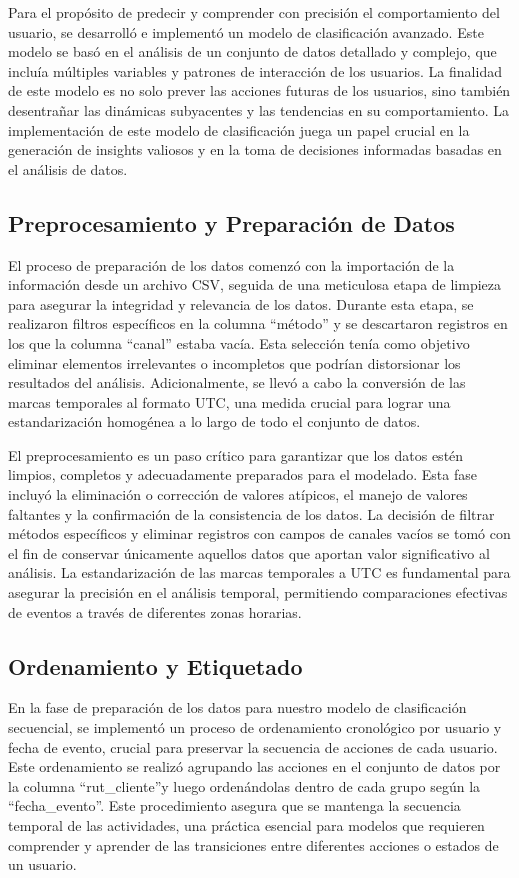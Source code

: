Para el propósito de predecir y comprender con precisión el comportamiento del usuario, se desarrolló e implementó un modelo de clasificación avanzado. Este modelo se basó en el análisis de un conjunto de datos detallado y complejo, que incluía múltiples variables y patrones de interacción de los usuarios. La finalidad de este modelo es no solo prever las acciones futuras de los usuarios, sino también desentrañar las dinámicas subyacentes y las tendencias en su comportamiento. La implementación de este modelo de clasificación juega un papel crucial en la generación de insights valiosos y en la toma de decisiones informadas basadas en el análisis de datos.

\subsection{Preprocesamiento y Preparación de Datos}

El proceso de preparación de los datos comenzó con la importación de la información desde un archivo CSV, seguida de una meticulosa etapa de limpieza para asegurar la integridad y relevancia de los datos. Durante esta etapa, se realizaron filtros específicos en la columna “método” y se descartaron registros en los que la columna “canal” estaba vacía. Esta selección tenía como objetivo eliminar elementos irrelevantes o incompletos que podrían distorsionar los resultados del análisis. Adicionalmente, se llevó a cabo la conversión de las marcas temporales al formato UTC, una medida crucial para lograr una estandarización homogénea a lo largo de todo el conjunto de datos.

El preprocesamiento es un paso crítico para garantizar que los datos estén limpios, completos y adecuadamente preparados para el modelado. Esta fase incluyó la eliminación o corrección de valores atípicos, el manejo de valores faltantes y la confirmación de la consistencia de los datos. La decisión de filtrar métodos específicos y eliminar registros con campos de canales vacíos se tomó con el fin de conservar únicamente aquellos datos que aportan valor significativo al análisis. La estandarización de las marcas temporales a UTC es fundamental para asegurar la precisión en el análisis temporal, permitiendo comparaciones efectivas de eventos a través de diferentes zonas horarias.
\subsection{Ordenamiento y Etiquetado}
En la fase de preparación de los datos para nuestro modelo de clasificación secuencial, se implementó un proceso de ordenamiento cronológico por usuario y fecha de evento, crucial para preservar la secuencia de acciones de cada usuario. Este ordenamiento se realizó agrupando las acciones en el conjunto de datos por la columna \textquotedblleft rut\_cliente\textquotedblright y luego ordenándolas dentro de cada grupo según la \textquotedblleft fecha\_evento\textquotedblright. Este procedimiento asegura que se mantenga la secuencia temporal de las actividades, una práctica esencial para modelos que requieren comprender y aprender de las transiciones entre diferentes acciones o estados de un usuario.

